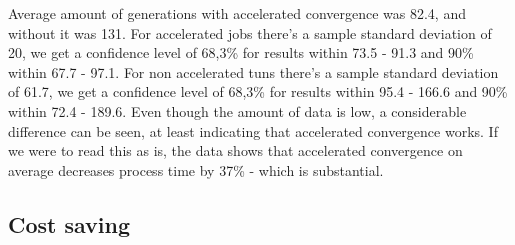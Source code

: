 \documentclass[a4paper,english]{report}
\begin{document}
	Average amount of generations with accelerated convergence was 82.4, and without it was 131. For accelerated jobs there's a sample standard deviation of 20, we get a confidence level of 68,3\% for results within 73.5 - 91.3 and 90\% within 67.7 - 97.1. For non accelerated tuns there's a sample standard deviation of 61.7, we get a confidence level of 68,3\% for results within 95.4 - 166.6 and 90\% within 72.4 - 189.6. Even though the amount of data is low, a considerable difference can be seen, at least indicating that accelerated convergence works. If we were to read this as is, the data shows that accelerated convergence on average decreases process time by 37\% - which is substantial.
	\subsection{Cost saving}
\end{document}
